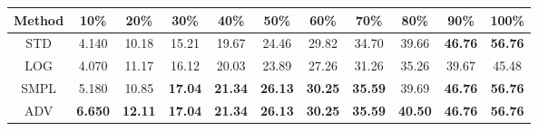\documentclass{standalone}
\begin{document}
\begin{tabular}{c|cccccccccc}
      \toprule
      Method & 10\% & 20\% & 30\% & 40\% & 50\% & 60\% & 70\% & 80\% & 90\% & 100\% \\
      \midrule
STD & 4.140 & 10.18 & 15.21 & 19.67 & 24.46 & 29.82 & 34.70 & 39.66 & \textbf{46.76} & \textbf{56.76}\\
LOG & 4.070 & 11.17 & 16.12 & 20.03 & 23.89 & 27.26 & 31.26 & 35.26 & 39.67 & 45.48\\
SMPL & 5.180 & 10.85 & \textbf{17.04} & \textbf{21.34} & \textbf{26.13} & \textbf{30.25} & \textbf{35.59} & 39.69 & \textbf{46.76} & \textbf{56.76}\\
ADV & \textbf{6.650} & \textbf{12.11} & \textbf{17.04} & \textbf{21.34} & \textbf{26.13} & \textbf{30.25} & \textbf{35.59} & \textbf{40.50} & \textbf{46.76} & \textbf{56.76}\\
  \bottomrule
\end{tabular}
\end{document}
